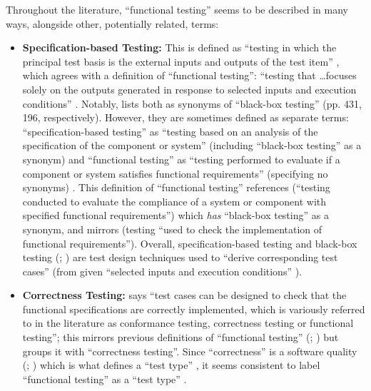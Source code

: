 Throughout the literature, ``functional testing'' seems to be described in many
ways, alongside other, potentially related, terms:

\begin{itemize}
      \item \textbf{Specification-based Testing:} This is defined as ``testing
            in which the principal test basis is the external inputs and
            outputs of the test item'' \citep[p.~9]{IEEE2022}, which agrees
            with a definition of ``functional testing'': ``testing that
            \dots focuses solely on the outputs generated in response to
            selected inputs and execution conditions'' \citep[p.~196]{IEEE2017}.
            Notably, \citet{IEEE2017} lists both as synonyms of
            ``black-box testing'' (pp. 431, 196, respectively). However,
            they are sometimes defined as separate terms: ``specification-based
            testing'' as ``testing based on an analysis of the specification
            of the component or system'' (including ``black-box testing'' as a
            synonym) and ``functional testing'' as ``testing performed to
            evaluate if a component or system satisfies functional
            requirements'' (specifying no synonyms) . This
            definition of
            ``functional testing'' references \citet[p.~196]{IEEE2017}
            (``testing conducted to evaluate the compliance of a system or
            component with specified functional requirements'') which
            \emph{has} ``black-box testing'' as a synonym, and mirrors
            \citet[p.~21]{IEEE2022} (testing ``used to check the implementation
            of functional requirements''). Overall, specification-based testing
            \citep[pp.~2-4, 6-9, 22]{IEEE2022} and black-box testing
            (\citealp[p.~5-10]{SWEBOK2024}; \citealp[p.~3]{SouzaEtAl2017})
            are test design techniques used to ``derive corresponding test cases''
            \citep[p.~11]{IEEE2022} (from given ``selected inputs and execution
            conditions'' \citep[p.~196]{IEEE2017}).

      \item \textbf{Correctness Testing:} \citet[p.~5-7]{SWEBOK2024} says
            ``test cases can be designed to check that the functional
            specifications are correctly implemented, which is variously
            referred to in the literature as conformance testing, correctness
            testing or functional testing''; this mirrors previous definitions
            of ``functional testing'' (\citealp[p.~21]{IEEE2022};
            \citeyear[p.~196]{IEEE2017}) but groups it with ``correctness
            testing''. Since ``correctness'' is a software quality
            (\citealp[p.~104]{IEEE2017}; \citealp[p.~3-13]{SWEBOK2024}) which is
            what defines a ``test type'' \cite[p.~15]{IEEE2022}, it seems
            consistent to label ``functional testing'' as a ``test type''
            \cite[pp.~15, 20, 22]{IEEE2022}.


\end{itemize}
